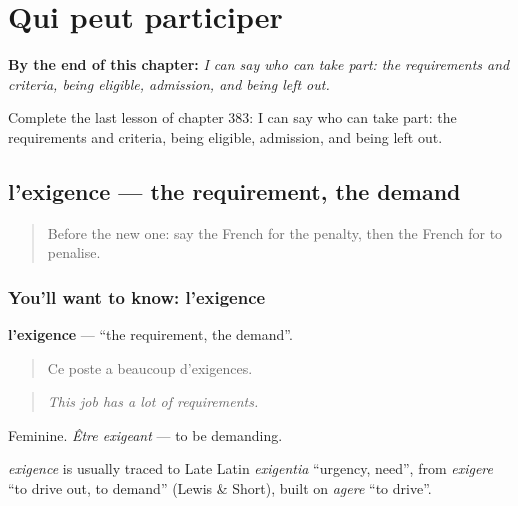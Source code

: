 
\chapter{Qui peut participer}
\label{ch:fr-qui-peut-participer}

\begin{chapteropening}
\textbf{By the end of this chapter:} \emph{I can say who can take part: the requirements and criteria, being eligible, admission, and being left out.}

Complete the last lesson of chapter 383: I can say who can take part: the requirements and criteria, being eligible, admission, and being left out.
\end{chapteropening}

\section[l'exigence]{l'exigence — the requirement, the demand}

\label{lesson:FR-C383-exigence}



\begin{quote}
Before the new one: say the French for the penalty, then the French for to penalise.
\end{quote}

\subsection*{You'll want to know: l'exigence}
\textbf{l'exigence} — \textquotedblleft{}the requirement, the demand\textquotedblright{}.

\begin{quote}
Ce poste a beaucoup d'exigences.
\end{quote}

\begin{quote}
\emph{This job has a lot of requirements.}
\end{quote}

Feminine. \emph{Être exigeant} — to be demanding.

\begin{cousinweb}
\emph{exigence} is usually traced to Late Latin \emph{exigentia} \textquotedblleft{}urgency, need\textquotedblright{}, from \emph{exigere} \textquotedblleft{}to drive out, to demand\textquotedblright{} (Lewis \& Short), built on \emph{agere} \textquotedblleft{}to drive\textquotedblright{}.
\end{cousinweb}

